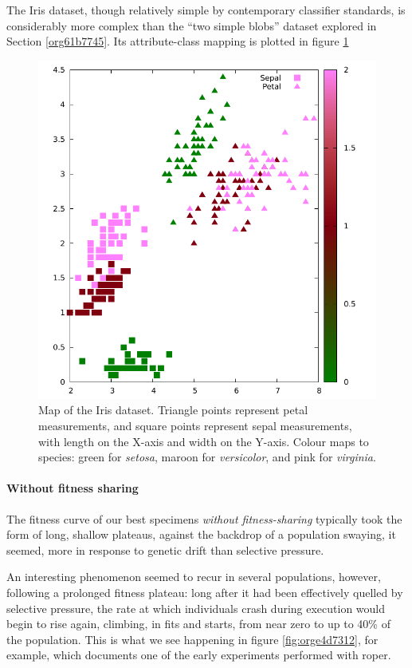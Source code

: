 \documentclass[12pt,glossary]{dalthesis}
\begin{document}
The Iris dataset, though relatively simple by contemporary classifier standards, 
is considerably more complex than the ``two simple blobs'' dataset explored in
Section \ref{org61b7745}. Its attribute-class mapping is plotted
in figure \ref{fig:orgdddaefe}

\begin{figure}[htbp]
\centering
\includegraphics[width=.9\linewidth]{../images/plots/iris_plot.pdf}
\caption{\label{fig:orgdddaefe}
Map of the Iris dataset. Triangle points represent petal measurements, and square points represent sepal measurements, with length on the X-axis and width on the Y-axis. Colour maps to species: green for \emph{setosa}, maroon for \emph{versicolor}, and pink for \emph{virginia}.}
\end{figure}


\paragraph{Without fitness sharing}
\label{sec:org38f6393}

The fitness curve of our best specimens \emph{without fitness-sharing} typically took
the form of long, shallow plateaus, against the backdrop of a population swaying,
it seemed, more in response to genetic drift than selective pressure.

An interesting phenomenon seemed to recur in several populations, however, following
a prolonged fitness plateau: long after it had been effectively quelled by selective
pressure, the rate at which individuals crash during execution would begin to rise
again, climbing, in fits and starts, from near zero to up to 40\% of the population.
This is what we see happening in figure \ref{fig:orge4d7312}, for example,
which documents one of the early experiments performed with \gls{roper}.
\end{document}
